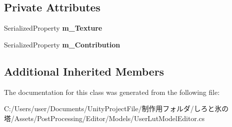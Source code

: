\subsection*{Private Attributes}
\begin{DoxyCompactItemize}
\item 
\mbox{\label{class_unity_editor_1_1_post_processing_1_1_user_lut_model_editor_ac301a31bf649a0a633c4dd527885dc35}} 
Serialized\+Property {\bfseries m\+\_\+\+Texture}
\item 
\mbox{\label{class_unity_editor_1_1_post_processing_1_1_user_lut_model_editor_a97b8889c3dd3f2b6dd7889e699ff1e74}} 
Serialized\+Property {\bfseries m\+\_\+\+Contribution}
\end{DoxyCompactItemize}
\subsection*{Additional Inherited Members}


The documentation for this class was generated from the following file\+:\begin{DoxyCompactItemize}
\item 
C\+:/\+Users/user/\+Documents/\+Unity\+Project\+File/制作用フォルダ/しろと氷の塔/\+Assets/\+Post\+Processing/\+Editor/\+Models/User\+Lut\+Model\+Editor.\+cs\end{DoxyCompactItemize}
